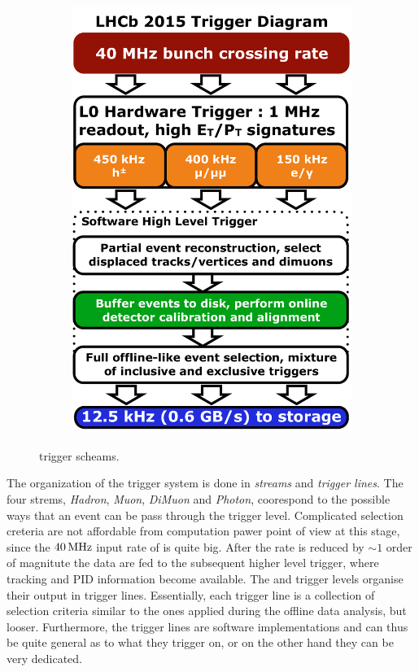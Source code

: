 \begin{figure}[t]
\begin{subfigure}{0.5\textwidth}
    \includegraphics[width=\textwidth]{Figures/Chapter2/LHCb_Trigger_RunII_May2015}
    \caption{}
    \label{run_one_trigger}
  \end{subfigure}
  \caption{ trigger scheams.}
  \label{trigger_scheams}
\end{figure}

The organization of the trigger system is done in {\it streams} and {\it trigger lines}.
The four strems, {\it Hadron}, {\it Muon}, {\it DiMuon} and {\it Photon}, coorespond to the possible
ways that an event can be pass through the \lzero trigger level. Complicated selection creteria are
not affordable from computation pawer point of view at this stage, since the $40{\rm \,MHz}$ input rate of \lzero is quite
big. After the rate is reduced by $\sim 1$ order of magnitute the data are fed to the subsequent
higher level trigger, where tracking and PID information become available. The \hltone and \hlttwo
trigger levels organise their output in trigger lines. Essentially, each trigger line is a collection
of selection criteria similar to the ones applied during the offline data analysis, but looser.
Furthermore, the trigger lines are software implementations and can thus be quite general as to what
they trigger on, or on the other hand they can be very dedicated.

